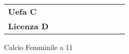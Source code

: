 \documentclass[../uefaC.tex]{subfiles}
\begin{document}
\begin{table}[!htbp]
\begin{tabular}{llllllllll}
    \textbf{Uefa C}    &                                                        &                                                 &                                                 &                                                 &                                                 &                                                 &                                                 &                                                 &                                                 \\
    \textbf{Licenza D} &                                                        &                                                 &                                                 &                                                 & \cellcolor[HTML]{C92FD7}                        & \cellcolor[HTML]{C92FD7}                        & \cellcolor[HTML]{C92FD7}                        & \cellcolor[HTML]{C92FD7}                        & \cellcolor[HTML]{C92FD7}                                               
    \end{tabular}
\end{table}

Calcio Femminile a 11 \hfill \\
\end{document}
